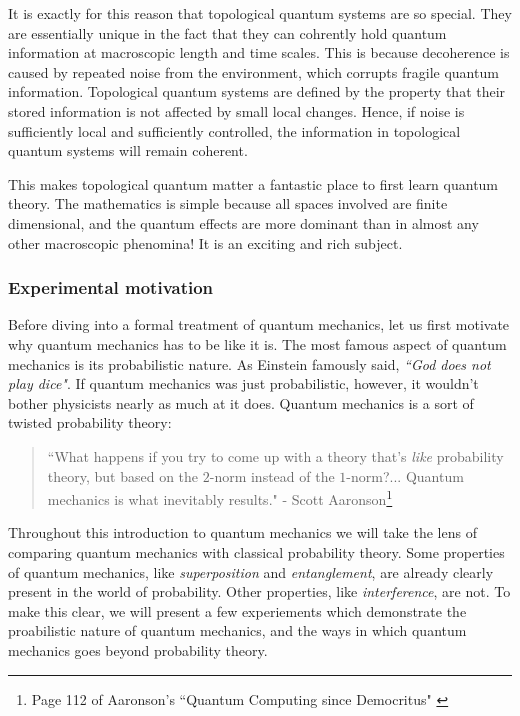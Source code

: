 It is exactly for this reason that topological quantum systems are so special. They are essentially unique in the fact that they can cohrently hold quantum information at macroscopic length and time scales. This is because decoherence is caused by repeated noise from the environment, which corrupts fragile quantum information. Topological quantum systems are defined by the property that their stored information is not affected by small local changes. Hence, if noise is sufficiently local and sufficiently controlled, the information in topological quantum systems will remain coherent. 

This makes topological quantum matter a fantastic place to first learn quantum theory. The mathematics is simple because all spaces involved are finite dimensional, and the quantum effects are more dominant than in almost any other macroscopic phenomina! It is an exciting and rich subject.

\subsubsection{Experimental motivation}

Before diving into a formal treatment of quantum mechanics, let us first motivate why quantum mechanics has to be like it is. The most famous aspect of quantum mechanics is its probabilistic nature. As Einstein famously said, \textit{``God does not play dice"}. If quantum mechanics was just probabilistic, however, it wouldn't bother physicists nearly as much at it does. Quantum mechanics is a sort of twisted probability theory:

\begin{quote}
``What happens if you try to come up with a theory that's \textit{like} probability theory, but based on the $2$-norm instead of the $1$-norm?... Quantum mechanics is what inevitably results." - Scott Aaronson\footnote{Page 112 of Aaronson's ``Quantum Computing since Democritus" \cite{aaronson2013quantum}}
\end{quote}

Throughout this introduction to quantum mechanics we will take the lens of comparing quantum mechanics with classical probability theory. Some properties of quantum mechanics, like \textit{superposition} and \textit{entanglement}, are already clearly present in the world of probability. Other properties, like \textit{interference}, are not. To make this clear, we will present a few experiements which demonstrate the proabilistic nature of quantum mechanics, and the ways in which quantum mechanics goes beyond probability theory.


